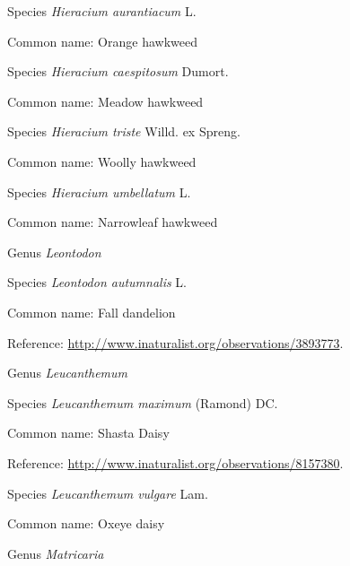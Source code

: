 \documentclass[9pt, article]{memoir}
\begin{document}
\begin{multicols}{2}
\vspace{6pt}\noindent\hspace{36pt}Species \textit{Hieracium aurantiacum} L.


Common name: Orange hawkweed

\vspace{6pt}\noindent\hspace{36pt}Species \textit{Hieracium caespitosum} Dumort.


Common name: Meadow hawkweed

\vspace{6pt}\noindent\hspace{36pt}Species \textit{Hieracium triste} Willd. ex Spreng.


Common name: Woolly hawkweed

\vspace{6pt}\noindent\hspace{36pt}Species \textit{Hieracium umbellatum} L.


Common name: Narrowleaf hawkweed

\vspace{6pt}\noindent\hspace{30pt}Genus \textit{Leontodon}


\vspace{6pt}\noindent\hspace{36pt}Species \textit{Leontodon autumnalis} L.


Common name: Fall dandelion

Reference: 
\url{http://www.inaturalist.org/observations/3893773}.

\vspace{6pt}\noindent\hspace{30pt}Genus \textit{Leucanthemum}


\vspace{6pt}\noindent\hspace{36pt}Species \textit{Leucanthemum maximum} (Ramond) DC.


Common name: Shasta Daisy

Reference: 
\url{http://www.inaturalist.org/observations/8157380}.

\vspace{6pt}\noindent\hspace{36pt}Species \textit{Leucanthemum vulgare} Lam.


Common name: Oxeye daisy

\vspace{6pt}\noindent\hspace{30pt}Genus \textit{Matricaria}



\end{multicols}
\end{document}
